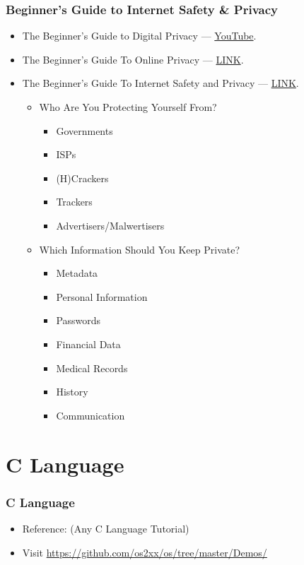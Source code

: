 \documentclass[aspectratio=169, xcolor=table, notheorems, hyperref={pdfpagelabels=false}]{beamer}
\begin{document}
\begin{frame}[fragile]
\frametitle{Beginner's Guide to Internet Safety \& Privacy}
\begin{itemize}
\item The Beginner’s Guide to Digital Privacy --- \href{https://www.youtube.com/watch?v=u8_9AQYLSbo}{YouTube}.
\item The Beginner’s Guide To Online Privacy  --- \href{https://www.freecodecamp.org/news/the-beginners-guide-to-online-privacy-7149b33c4a3e/}{LINK}.
\item The Beginner’s Guide To Internet Safety and Privacy --- \href{http://choosetoencrypt.com/privacy/complete-beginners-guide-to-internet-safety-privacy/}{LINK}.
\begin{itemize}
\item Who Are You Protecting Yourself From?
\begin{itemize}
\item Governments
\item ISPs
\item (H)Crackers
\item Trackers
\item Advertisers/Malwertisers
\end{itemize}
\item Which Information Should You Keep Private?
\begin{itemize}
\item Metadata
\item Personal Information
\item Passwords
\item Financial Data
\item Medical Records
\item History
\item Communication
\end{itemize}
\end{itemize}
\end{itemize}
\end{frame}

\section{C Language}
\begin{frame}
\frametitle{C Language}
\begin{itemize}
\item Reference: (Any C Language Tutorial)
\item Visit
\url{https://github.com/os2xx/os/tree/master/Demos/}
\end{itemize}
\end{frame}
\end{document}
